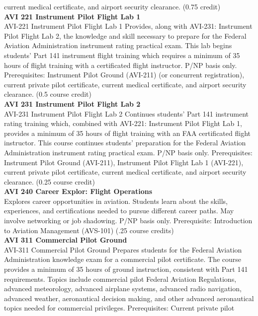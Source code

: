 \documentclass[
  letterpaper,
]{scrbook}
\begin{document}
current medical certificate, and airport security clearance. (0.75
credit)\\
\textbf{AVI 221 Instrument Pilot Flight Lab 1}\\
AVI-221 Instrument Pilot Flight Lab 1 Provides, along with AVI-231:
Instrument Pilot Flight Lab 2, the knowledge and skill necessary to
prepare for the Federal Aviation Administration instrument rating
practical exam. This lab begins students' Part 141 instrument flight
training which requires a minimum of 35 hours of flight training with a
certificated flight instructor. P/NP basis only. Prerequisites:
Instrument Pilot Ground (AVI-211) (or concurrent registration), current
private pilot certificate, current medical certificate, and airport
security clearance. (0.5 course credit)\\
\textbf{AVI 231 Instrument Pilot Flight Lab 2}\\
AVI-231 Instrument Pilot Flight Lab 2 Continues students' Part 141
instrument rating training which, combined with AVI-221: Instrument
Pilot Flight Lab 1, provides a minimum of 35 hours of flight training
with an FAA certificated flight instructor. This course continues
students' preparation for the Federal Aviation Administration instrument
rating practical exam. P/NP basis only. Prerequisites: Instrument Pilot
Ground (AVI-211), Instrument Pilot Flight Lab 1 (AVI-221), current
private pilot certificate, current medical certificate, and airport
security clearance. (0.25 course credit)\\
\textbf{AVI 240 Career Explor: Flight Operations}\\
Explores career opportunities in aviation. Students learn about the
skills, experiences, and certifications needed to pursue different
career paths. May involve networking or job shadowing. P/NP basis only.
Prerequisite: Introduction to Aviation Management (AVS-101) (.25 course
credits)\\
\textbf{AVI 311 Commercial Pilot Ground}\\
AVI-311 Commercial Pilot Ground Prepares students for the Federal
Aviation Administration knowledge exam for a commercial pilot
certificate. The course provides a minimum of 35 hours of ground
instruction, consistent with Part 141 requirements. Topics include
commercial pilot Federal Aviation Regulations, advanced meteorology,
advanced airplane systems, advanced radio navigation, advanced weather,
aeronautical decision making, and other advanced aeronautical topics
needed for commercial privileges. Prerequisites: Current private pilot
\end{document}
